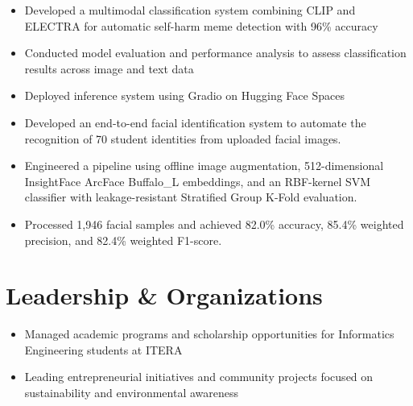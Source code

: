 \begin{itemize}
  \item Developed a multimodal classification system combining CLIP and ELECTRA for automatic self-harm meme detection with 96\% accuracy
  \item Conducted model evaluation and performance analysis to assess classification results across image and text data
  \item Deployed inference system using Gradio on Hugging Face Spaces
\end{itemize}

\begin{itemize}
  \item Developed an end-to-end facial identification system to automate the recognition of 70 student identities from uploaded facial images.
  \item Engineered a pipeline using offline image augmentation, 512-dimensional InsightFace ArcFace Buffalo\_L embeddings, and an RBF-kernel SVM classifier with leakage-resistant Stratified Group K-Fold evaluation.
  \item Processed 1,946 facial samples and achieved 82.0\% accuracy, 85.4\% weighted precision, and 82.4\% weighted F1-score.
\end{itemize}

\section*{Leadership \& Organizations}
\begin{itemize}
  \item Managed academic programs and scholarship opportunities for Informatics Engineering students at ITERA
\end{itemize}

\begin{itemize}
  \item Leading entrepreneurial initiatives and community projects focused on sustainability and environmental awareness
\end{itemize}

